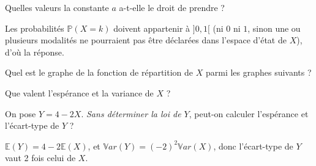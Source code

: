 \begin{question}
Quelles valeurs la constante $a$ a-t-elle le droit de prendre ?
\begin{answers}
\bad{Toutes les valeurs de $]0,1[$ car $\mathbb{P}(X=0)+\mathbb{P}(X=1)+\mathbb{P}(X=2)=1$.}
\good{Toutes les valeurs de $]0,1/2[$.}
\end{answers}
\begin{explanations} Les probabilités $\mathbb{P}(X=k)$ doivent appartenir à $]0,1[$ (ni $0$ ni $1$, sinon une ou plusieurs modalités ne pourraient pas être déclarées dans l'espace d'état de $X$), d'où la réponse.
\end{explanations}
\end{question}


\begin{question}
Quel est le graphe de la fonction de répartition de $X$ parmi les graphes suivants ?

%



\begin{answers}
\end{answers}
\end{question}


\begin{question}
Que valent l'espérance et la variance de $X$ ? 
\begin{answers}
\end{answers}
\end{question}


\begin{question}
On pose $Y=4-2X$. \emph{Sans déterminer la loi de $Y$}, peut-on calculer l'espérance et l'écart-type de $Y$ ?
\begin{answers}
\end{answers}
\begin{explanations} $\mathbb{E}(Y)=4-2\mathbb{E}(X)$, et $\mathbb{V}ar(Y)=(-2)^2\mathbb{V}ar(X)$, donc l'écart-type de $Y$ vaut 2 fois celui de $X$.
\end{explanations}
\end{question}




